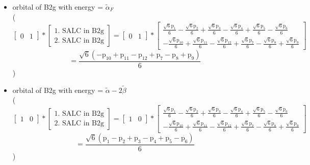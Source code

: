 \documentclass[12pt,a4paper]{article}
\begin{document}
\begin{itemize}
\textcolor{red}{Error in Orthogonalization of SALCs}\item orbital of B2g with energy = 
                                $\tilde{\alpha}_{F}$ \\
( 
$$
\left[\begin{matrix}0 & 1\end{matrix}\right] * \left[\begin{array}{c}\text{1. SALC in B2g} \\ \text{2. SALC in B2g}\end{array}\right] = \left[\begin{matrix}0 & 1\end{matrix}\right] * \left[\begin{matrix}\frac{\sqrt{6} \text{p}_{1}}{6} - \frac{\sqrt{6} \text{p}_{2}}{6} + \frac{\sqrt{6} \text{p}_{3}}{6} - \frac{\sqrt{6} \text{p}_{4}}{6} + \frac{\sqrt{6} \text{p}_{5}}{6} - \frac{\sqrt{6} \text{p}_{6}}{6}\\- \frac{\sqrt{6} \text{p}_{10}}{6} + \frac{\sqrt{6} \text{p}_{11}}{6} - \frac{\sqrt{6} \text{p}_{12}}{6} + \frac{\sqrt{6} \text{p}_{7}}{6} - \frac{\sqrt{6} \text{p}_{8}}{6} + \frac{\sqrt{6} \text{p}_{9}}{6}\end{matrix}\right] 
 $$ $$ = \frac{\sqrt{6} \left(- \text{p}_{10} + \text{p}_{11} - \text{p}_{12} + \text{p}_{7} - \text{p}_{8} + \text{p}_{9}\right)}{6} 
 $$ 
 )

\item orbital of B2g with energy = 
                                $\tilde{\alpha} - 2 \tilde{\beta}$ \\
( 
$$
\left[\begin{matrix}1 & 0\end{matrix}\right] * \left[\begin{array}{c}\text{1. SALC in B2g} \\ \text{2. SALC in B2g}\end{array}\right] = \left[\begin{matrix}1 & 0\end{matrix}\right] * \left[\begin{matrix}\frac{\sqrt{6} \text{p}_{1}}{6} - \frac{\sqrt{6} \text{p}_{2}}{6} + \frac{\sqrt{6} \text{p}_{3}}{6} - \frac{\sqrt{6} \text{p}_{4}}{6} + \frac{\sqrt{6} \text{p}_{5}}{6} - \frac{\sqrt{6} \text{p}_{6}}{6}\\- \frac{\sqrt{6} \text{p}_{10}}{6} + \frac{\sqrt{6} \text{p}_{11}}{6} - \frac{\sqrt{6} \text{p}_{12}}{6} + \frac{\sqrt{6} \text{p}_{7}}{6} - \frac{\sqrt{6} \text{p}_{8}}{6} + \frac{\sqrt{6} \text{p}_{9}}{6}\end{matrix}\right] 
 $$ $$ = \frac{\sqrt{6} \left(\text{p}_{1} - \text{p}_{2} + \text{p}_{3} - \text{p}_{4} + \text{p}_{5} - \text{p}_{6}\right)}{6} 
 $$ 
 )


\end{itemize}
\end{document}
